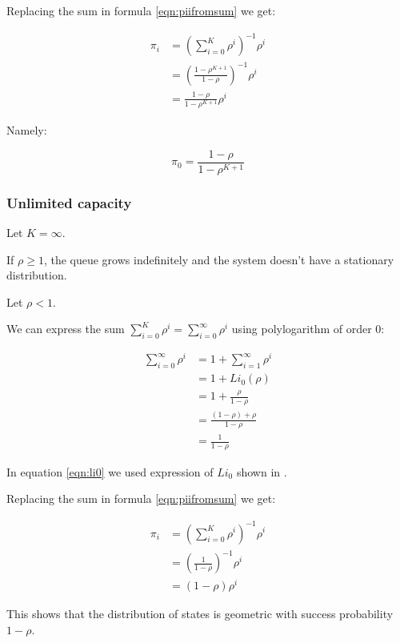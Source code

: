 \documentclass{article}
\begin{document}
Replacing the sum in formula \ref{eqn:piifromsum} we get:

\begin{align}
\pi_i &= \left( \sum_{i=0}^K \rho^i \right)^{-1} \rho^i \\
&= \left( \frac{1 - \rho^{K+1}}{1 - \rho} \right)^{-1} \rho^i \\
&= \frac{1 - \rho}{1 - \rho^{K+1}} \rho^i
\end{align}

Namely:

\begin{equation} \label{eqn:pi0limited}
\pi_0 = \frac{1 - \rho}{1 - \rho^{K+1}}
\end{equation}

\subsubsection{Unlimited capacity}

Let $K = \infty$.

If $\rho \geq 1$, the queue grows indefinitely
and the system doesn't have a stationary distribution.

Let $\rho < 1$.

We can express the sum $\sum_{i=0}^K \rho^i = \sum_{i=0}^\infty \rho^i$
using polylogarithm of order $0$:

\begin{align}
\sum_{i=0}^\infty \rho^i &= 1 + \sum_{i=1}^\infty \rho^i \\
&= 1 + Li_0(\rho) \\
&= 1 + \frac{\rho}{1 - \rho} \label{eqn:li0} \\
&= \frac{(1 - \rho) + \rho}{1 - \rho} \\
&= \frac{1}{1 - \rho}
\end{align}

In equation \ref{eqn:li0} we used expression of $Li_0$ shown in
\cite[section Particular values]{wiki:polylogarithm}.

Replacing the sum in formula \ref{eqn:piifromsum} we get:

\begin{align}
\pi_i &= \left( \sum_{i=0}^K \rho^i \right)^{-1} \rho^i \\
&= \left( \frac{1}{1 - \rho} \right)^{-1} \rho^i \\
&= (1 - \rho) \rho^i
\end{align}

This shows that the distribution of states is geometric
with success probability $1 - \rho$.
\end{document}
